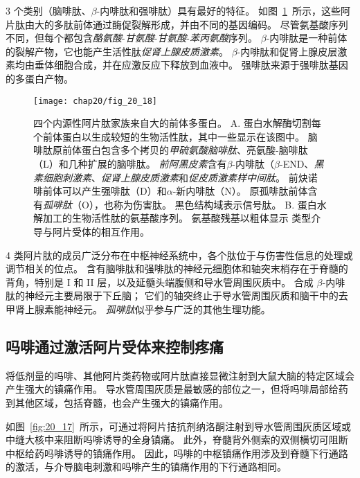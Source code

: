 3 个类别（脑啡肽、$ \beta $-内啡肽和强啡肽）具有最好的特征。
如图~\ref{fig:20_18}~所示，这些阿片肽由大的多肽前体通过酶促裂解形成，并由不同的基因编码。
尽管氨基酸序列不同，但每个都包含\textit{酪氨酸}-\textit{甘氨酸}-\textit{甘氨酸}-\textit{苯丙氨酸}序列。
$ \beta $-内啡肽是一种前体的裂解产物，它也能产生活性肽\textit{促肾上腺皮质激素}。
$ \beta $-内啡肽和促肾上腺皮层激素均由垂体细胞合成，并在应激反应下释放到血液中。
强啡肽来源于强啡肽基因的多蛋白产物。


\begin{figure}[htbp]
	\centering
	\texttt{[image: chap20/fig\_20\_18]}
	\caption{四个内源性阿片肽家族来自大的前体多蛋白。
		A. 蛋白水解酶切割每个前体蛋白以生成较短的生物活性肽，其中一些显示在该图中。
		脑啡肽原前体蛋白包含多个拷贝的\textit{甲硫氨酸脑啡肽}、亮氨酸-脑啡肽（L）和几种扩展的脑啡肽。
		\textit{前阿黑皮素}含有$\beta$-内啡肽（$\beta$-END、\textit{黑素细胞刺激素}、\textit{促肾上腺皮质激素}和\textit{促皮质激素样中间肽}。
		前炔诺啡前体可以产生强啡肽（D）和$\alpha$-新内啡肽（N）。
		原孤啡肽前体含有\textit{孤啡肽}（O），也称为伤害肽。
		黑色结构域表示信号肽。
		B. 蛋白水解加工的生物活性肽的氨基酸序列。
		氨基酸残基以粗体显示 类型介导与阿片受体的相互作用\cite{fields1987painful}。}
	\label{fig:20_18}
\end{figure}


4 类阿片肽的成员广泛分布在中枢神经系统中，各个肽位于与伤害性信息的处理或调节相关的位点。
含有脑啡肽和强啡肽的神经元细胞体和轴突末梢存在于脊髓的背角，特别是 I 和 II 层，以及延髓头端腹侧和导水管周围灰质中。
合成 $\beta$-内啡肽的神经元主要局限于下丘脑；
它们的轴突终止于导水管周围灰质和脑干中的去甲肾上腺素能神经元。
\textit{孤啡肽}似乎参与广泛的其他生理功能。



\subsection{吗啡通过激活阿片受体来控制疼痛}

将低剂量的吗啡、其他阿片类药物或阿片肽直接显微注射到大鼠大脑的特定区域会产生强大的镇痛作用。
导水管周围灰质是最敏感的部位之一，但将吗啡局部给药到其他区域，包括脊髓，也会产生强大的镇痛作用。


如图~\ref{fig:20_17}~所示，可通过将阿片拮抗剂纳洛酮注射到导水管周围灰质区域或中缝大核中来阻断吗啡诱导的全身镇痛。
此外，脊髓背外侧索的双侧横切可阻断中枢给药吗啡诱导的镇痛作用。
因此，吗啡的中枢镇痛作用涉及到脊髓下行通路的激活，与介导脑电刺激和吗啡产生的镇痛作用的下行通路相同。


